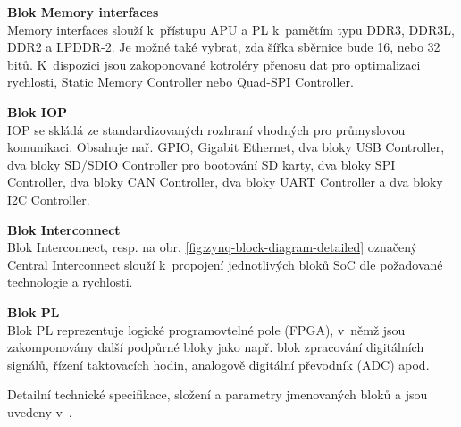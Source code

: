 \documentclass[a4paper, twoside, 11pt]{article}
\begin{document}
			\noindent\textbf{Blok Memory interfaces}\\
			Memory interfaces slouží k~přístupu APU a PL k~pamětím typu DDR3, DDR3L, DDR2 a LPDDR-2. Je možné také vybrat, zda šířka sběrnice bude 16, nebo 32 bitů. K~dispozici jsou zakoponované kotroléry přenosu dat pro optimalizaci rychlosti, Static Memory Controller nebo Quad-SPI Controller.\par\vspace*{0.25cm}
			\noindent\textbf{Blok IOP}\\
			IOP se skládá ze standardizovaných rozhraní vhodných pro průmyslovou komunikaci. Obsahuje nař. GPIO, Gigabit Ethernet, dva bloky USB Controller, dva bloky SD/SDIO Controller pro bootování SD karty, dva bloky SPI Controller, dva bloky CAN Controller, dva bloky UART Controller a dva bloky I2C Controller.\par\vspace*{0.25cm}
			\noindent\textbf{Blok Interconnect}\\
			Blok Interconnect, resp. na obr. \ref{fig:zynq-block-diagram-detailed} označený Central Interconnect slouží k~propojení jednotlivých bloků SoC dle požadované technologie a rychlosti.\par\vspace*{0.25cm}
			\noindent\textbf{Blok PL}\\
			Blok PL reprezentuje logické programovtelné pole (FPGA), v~němž jsou zakomponovány další podpůrné bloky jako např. blok zpracování digitálních signálů, řízení taktovacích hodin, analogově digitální převodník (ADC) apod.\par\vspace*{0.35cm}
			\noindent Detailní technické specifikace, složení a parametry jmenovaných bloků a jsou uvedeny v~\cite{xilinx-zynq-7000-technical-reference-manual}.
\end{document}

